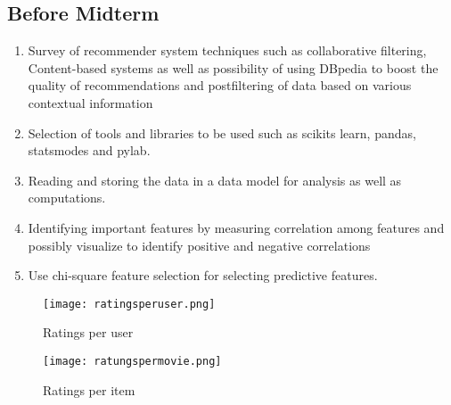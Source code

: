 \documentclass{article}
\begin{document}
\subsection{Before Midterm}
\begin{enumerate}
\item Survey of recommender system techniques such as collaborative filtering, Content-based systems  as well as possibility of using DBpedia to boost  the quality of recommendations\cite{ostuni2012cinemappy} and postfiltering of data based on various contextual information
\item Selection of tools and libraries to be used such as 
scikits learn, pandas, statsmodes and pylab.
\item Reading and storing the data in a data model for analysis as well as computations.
\item Identifying important features by measuring 
correlation among features and possibly visualize 
to identify positive and negative correlations
\item Use chi-square feature selection for  selecting 
predictive features.
\end{enumerate}


\begin{figure}[H]
\centering
\texttt{[image: ratingsperuser.png]}
\caption{Ratings per user}
\label{ruser}
\end{figure}

\begin{figure}[H]
\centering
\texttt{[image: ratungspermovie.png]}
\caption{Ratings per item}
\label{ritem}
\end{figure}



\end{document}
